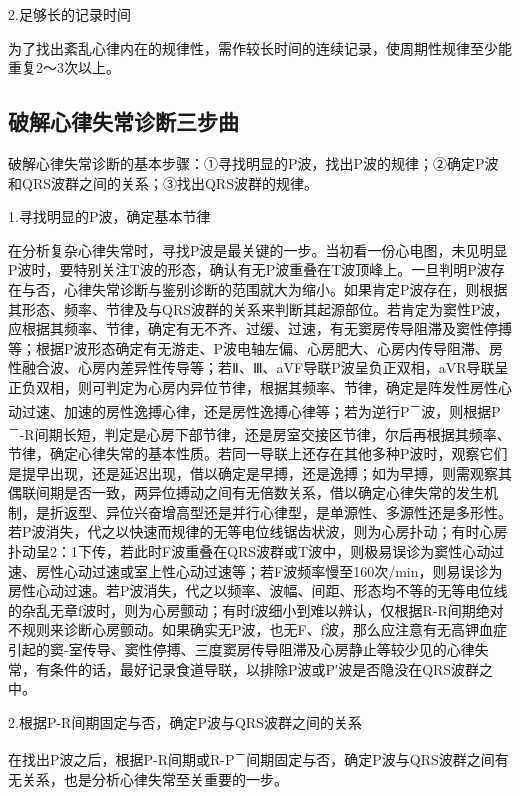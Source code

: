2.足够长的记录时间

为了找出紊乱心律内在的规律性，需作较长时间的连续记录，使周期性规律至少能重复2～3次以上。

\protect\hypertarget{text00016.htmlux5cux23subid117}{}{}

\subsection{破解心律失常诊断三步曲}

破解心律失常诊断的基本步骤：①寻找明显的P波，找出P波的规律；②确定P波和QRS波群之间的关系；③找出QRS波群的规律。

1.寻找明显的P波，确定基本节律

在分析复杂心律失常时，寻找P波是最关键的一步。当初看一份心电图，未见明显P波时，要特别关注T波的形态，确认有无P波重叠在T波顶峰上。一旦判明P波存在与否，心律失常诊断与鉴别诊断的范围就大为缩小。如果肯定P波存在，则根据其形态、频率、节律及与QRS波群的关系来判断其起源部位。若肯定为窦性P波，应根据其频率、节律，确定有无不齐、过缓、过速，有无窦房传导阻滞及窦性停搏等；根据P波形态确定有无游走、P波电轴左偏、心房肥大、心房内传导阻滞、房性融合波、心房内差异性传导等；若Ⅱ、Ⅲ、aVF导联P波呈负正双相，aVR导联呈正负双相，则可判定为心房内异位节律，根据其频率、节律，确定是阵发性房性心动过速、加速的房性逸搏心律，还是房性逸搏心律等；若为逆行P\textsuperscript{－}波，则根据P\textsuperscript{－}-R间期长短，判定是心房下部节律，还是房室交接区节律，尔后再根据其频率、节律，确定心律失常的基本性质。若同一导联上还存在其他多种P波时，观察它们是提早出现，还是延迟出现，借以确定是早搏，还是逸搏；如为早搏，则需观察其偶联间期是否一致，两异位搏动之间有无倍数关系，借以确定心律失常的发生机制，是折返型、异位兴奋增高型还是并行心律型，是单源性、多源性还是多形性。若P波消失，代之以快速而规律的无等电位线锯齿状波，则为心房扑动；有时心房扑动呈2：1下传，若此时F波重叠在QRS波群或T波中，则极易误诊为窦性心动过速、房性心动过速或室上性心动过速等；若F波频率慢至160次/min，则易误诊为房性心动过速。若P波消失，代之以频率、波幅、间距、形态均不等的无等电位线的杂乱无章f波时，则为心房颤动；有时f波细小到难以辨认，仅根据R-R间期绝对不规则来诊断心房颤动。如果确实无P波，也无F、f波，那么应注意有无高钾血症引起的窦-室传导、窦性停搏、三度窦房传导阻滞及心房静止等较少见的心律失常，有条件的话，最好记录食道导联，以排除P波或P′波是否隐没在QRS波群之中。

2.根据P-R间期固定与否，确定P波与QRS波群之间的关系

在找出P波之后，根据P-R间期或R-P\textsuperscript{－}间期固定与否，确定P波与QRS波群之间有无关系，也是分析心律失常至关重要的一步。

